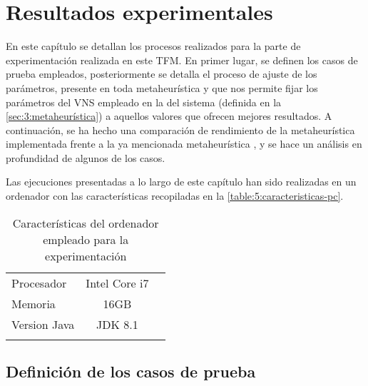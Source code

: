 \graphicspath{{capitulos/Capitulo5-Resultados-experimentales/recursos/}}

\section{Resultados experimentales} \label{capitulo:5}

En este capítulo se detallan los procesos realizados para la parte de experimentación realizada en este TFM. En primer lugar, se definen los casos de prueba empleados, posteriormente se detalla el proceso de ajuste de los parámetros, presente en toda metaheurística y que nos permite fijar los parámetros del VNS empleado en la \fasedos{} del sistema (definida en la \autoref{sec:3:metaheurística}) a aquellos valores que ofrecen mejores resultados. A continuación, se ha hecho una comparación de rendimiento de la metaheurística implementada frente a la ya mencionada metaheurística \sa{}, y se hace un análisis en profundidad de algunos de los casos.

Las ejecuciones presentadas a lo largo de este capítulo han sido realizadas en un ordenador con las características recopiladas en la \autoref{table:5:caracteristicas-pc}.

\begin{table}[h]
	\centering
	\caption{Características del ordenador empleado para la experimentación}
	\begin{tabular}{lcc}
		\hline
		Procesador   & Intel Core i7 &  \\
		Memoria      &     16GB      &  \\
		Version Java &    JDK 8.1    &  \\ \hline
		             &               &
	\end{tabular}
\label{table:5:caracteristicas-pc}
\end{table}

\subsection{Definición de los casos de prueba}
\label{sec:5:def-casos}

